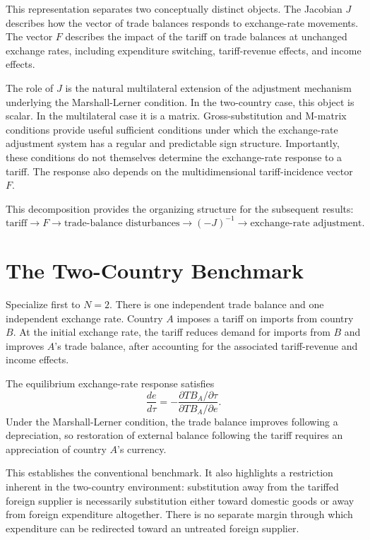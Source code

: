 \documentclass[11pt]{article}
\begin{document}
This representation separates two conceptually distinct objects. The Jacobian $J$ describes how the vector of trade balances responds to exchange-rate movements. The vector $F$ describes the impact of the tariff on trade balances at unchanged exchange rates, including expenditure switching, tariff-revenue effects, and income effects.

The role of $J$ is the natural multilateral extension of the adjustment mechanism underlying the Marshall-Lerner condition. In the two-country case, this object is scalar. In the multilateral case it is a matrix. Gross-substitution and M-matrix conditions provide useful sufficient conditions under which the exchange-rate adjustment system has a regular and predictable sign structure. Importantly, these conditions do not themselves determine the exchange-rate response to a tariff. The response also depends on the multidimensional tariff-incidence vector $F$.

This decomposition provides the organizing structure for the subsequent results:
\[
\text{tariff} \longrightarrow F
\longrightarrow \text{trade-balance disturbances}
\longrightarrow (-J)^{-1}
\longrightarrow \text{exchange-rate adjustment}.
\]

\section{The Two-Country Benchmark}

Specialize first to $N=2$. There is one independent trade balance and one independent exchange rate. Country $A$ imposes a tariff on imports from country $B$. At the initial exchange rate, the tariff reduces demand for imports from $B$ and improves $A$'s trade balance, after accounting for the associated tariff-revenue and income effects.

The equilibrium exchange-rate response satisfies
\[
\frac{de}{d\tau}
=
-\frac{\partial TB_A/\partial\tau}
{\partial TB_A/\partial e}.
\]
Under the Marshall-Lerner condition, the trade balance improves following a depreciation, so restoration of external balance following the tariff requires an appreciation of country $A$'s currency.

This establishes the conventional benchmark. It also highlights a restriction inherent in the two-country environment: substitution away from the tariffed foreign supplier is necessarily substitution either toward domestic goods or away from foreign expenditure altogether. There is no separate margin through which expenditure can be redirected toward an untreated foreign supplier.
\end{document}
